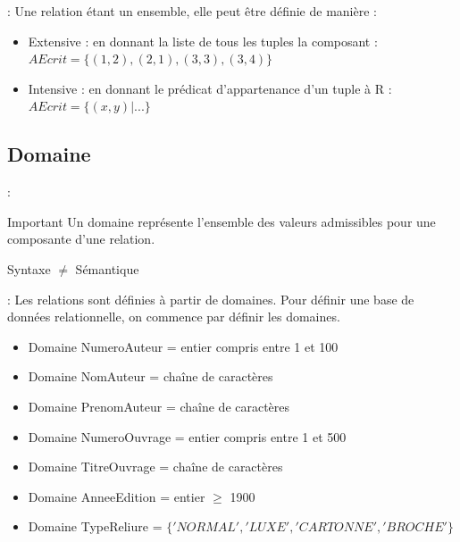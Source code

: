 \documentclass[10pt]{beamer}
\begin{document}
\begin{frame}{\secname : \subsecname}
    Une relation étant un ensemble, elle peut être définie de manière :
    \begin{itemize}
        \item Extensive : en donnant la liste de tous les tuples la composant : $AEcrit = \{(1, 2), (2, 1), (3, 3), (3, 4)\}$
        \item Intensive : en donnant le prédicat d’appartenance d’un tuple à R : $AEcrit = \{ (x, y) | ... \}$

    \end{itemize}
\end{frame}
\subsection{Domaine}

\begin{frame}{\secname : \subsecname}

    \begin{alertblock}{Important}
        Un domaine représente l’ensemble des valeurs admissibles pour une composante d’une relation.
    \end{alertblock}
    Syntaxe $\neq$ Sémantique
\end{frame}

\begin{frame}{\secname : \subsecname}
    Les relations sont définies à partir de domaines.
    Pour définir une base de données relationnelle, on commence par définir les domaines.
    \begin{itemize}
        \item Domaine NumeroAuteur = entier compris entre 1 et 100
        \item Domaine NomAuteur = chaîne de caractères
        \item Domaine PrenomAuteur = chaîne de caractères
        \item Domaine NumeroOuvrage = entier compris entre 1 et 500
        \item Domaine TitreOuvrage = chaîne de caractères
        \item Domaine AnneeEdition = entier $\geq$ 1900
        \item Domaine TypeReliure = $\{'NORMAL', 'LUXE', 'CARTONNE', 'BROCHE'\}$
    \end{itemize}
\end{frame}
\end{document}
